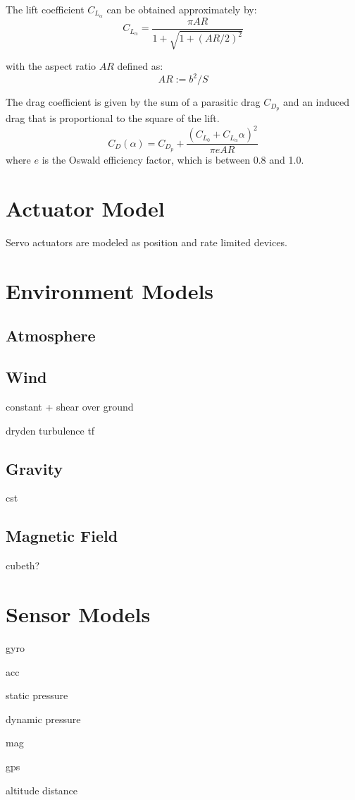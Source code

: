 \documentclass[a4paper]{paper}
\begin{document}
The lift coefficient $C_{L_\alpha}$ can be obtained approximately by:
\begin{equation}
    C_{L_\alpha} = \frac{\pi AR}{1 + \sqrt{1 + (AR/2)^2}}
\end{equation}

with the aspect ratio $AR$ defined as:
\begin{equation}
    AR := b^2/S
\end{equation}

The drag coefficient is given by the sum of a parasitic drag $C_{D_p}$ and an induced drag that is proportional to the square of the lift.
\begin{equation}
    C_D(\alpha) = C_{D_p} + \frac{(C_{L_0} + C_{L_\alpha}\alpha)^2}{\pi e AR}
\end{equation}
where $e$ is the Oswald efficiency factor, which is between 0.8 and 1.0.

\section{Actuator Model}

Servo actuators are modeled as position and rate limited devices.

\section{Environment Models}

\subsection{Atmosphere}

\subsection{Wind}

constant + shear over ground

dryden turbulence tf

\subsection{Gravity}

cst

\subsection{Magnetic Field}

cubeth?

\section{Sensor Models}

gyro

acc

static pressure

dynamic pressure

mag

gps

altitude distance
\end{document}
